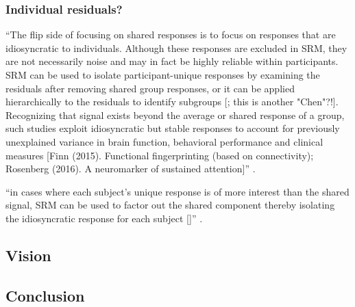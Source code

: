 \subsubsection{Individual residuals?}



%
``The flip side of focusing on shared responses is to focus on responses that
are idiosyncratic to individuals.
%
Although these responses are excluded in SRM, they are not necessarily noise and
may in fact be highly reliable within participants.
%
SRM can be used to isolate participant-unique responses by examining the
residuals after removing shared group responses, or it can be applied
hierarchically to the residuals to identify subgroups [\citet{chen2017shared};
this is another "Chen"?!].
%
Recognizing that signal exists beyond the average or shared response of a group,
such studies exploit idiosyncratic but stable responses to account for
previously unexplained variance in brain function, behavioral performance and
clinical measures [Finn (2015). Functional fingerprinting (based on
connectivity); Rosenberg (2016). A neuromarker of sustained attention]''
\citep{cohen2017computational}.

%
``in cases where each subject's unique response is of more interest
than the shared signal, SRM can be used to factor out the shared component
thereby isolating the idiosyncratic response for each subject
[\citep{chen2015reduced}]'' \citep{kumar2020brainiak}.


\subsection{Vision}




\subsection{Conclusion}

